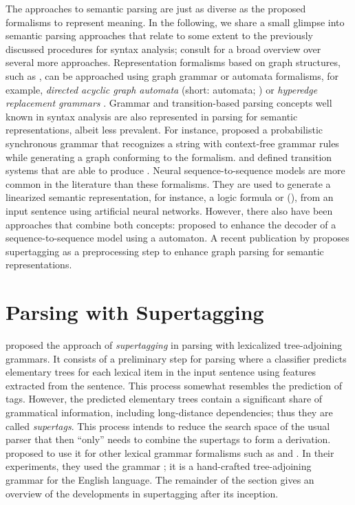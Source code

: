 \documentclass[../document.tex]{subfiles}
\begin{document}
    The approaches to semantic parsing are just as diverse as the proposed formalisms to represent meaning.
    In the following, we share a small glimpse into semantic parsing approaches that relate to some extent to the previously discussed procedures for syntax analysis; consult \citet{kamath2018survey} for a broad overview over several more approaches.
    Representation formalisms based on graph structures, such as , can be approached using graph grammar or automata formalisms, for example, \emph{directed acyclic graph automata} (short:  automata; \citealp{fancellu-etal-2019-semantic}) or \emph{hyperedge replacement grammars} \citep{drewes1997hyperedge}.
    Grammar and transition-based parsing concepts well known in syntax analysis are also represented in parsing for semantic representations, albeit less prevalent.
    For instance, \citet{peng2015synchronous} proposed a probabilistic synchronous grammar that recognizes a string with context-free grammar rules while generating a graph conforming to the  formalism.
     and \citet{vilares-gomez-rodriguez-2018-transition} defined transition systems that are able to produce .
    Neural sequence-to-sequence models are more common in the literature than these formalisms.
    They are used to generate a linearized semantic representation, for instance, a logic formula \citep{dong-lapata-2016-language} or  (\citep{zhang-etal-2019-amr}), from an input sentence using artificial neural networks.
    However, there also have been approaches that combine both concepts:  proposed to enhance the decoder of a sequence-to-sequence model using a  automaton.
    A recent publication by \citet{pet23} proposes supertagging as a preprocessing step to enhance graph parsing for semantic representations.

    \section{Parsing with Supertagging}\label{sec:literature:supertagging}
     proposed the approach of \emph{supertagging} in parsing with lexicalized tree-adjoining grammars.
    It consists of a preliminary step for parsing where a classifier predicts elementary trees for each lexical item in the input sentence using features extracted from the sentence.
    This process somewhat resembles the prediction of  tags.
    However, the predicted elementary trees contain a significant share of grammatical information, including long-distance dependencies; thus they are called \emph{supertags}.
    This process intends to reduce the search space of the usual parser that then ``only'' needs to combine the supertags to form a derivation.
     proposed to use it for other lexical grammar formalisms such as  and .
    In their experiments, they used the  grammar \citep{xtag01}; it is a hand-crafted tree-adjoining grammar for the English language.
    The remainder of the section gives an overview of the developments in supertagging after its inception.
\end{document}
